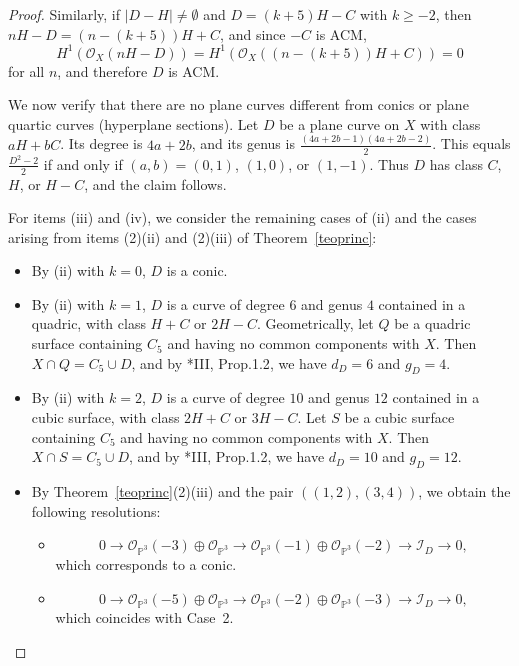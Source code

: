 \documentclass[12pt,reqno]{amsart}
\theoremstyle{plain}
\theoremstyle{definition}
\theoremstyle{remark}
\theoremstyle{definition}
\newcommand{\PP}{\mathds{P}}
\newcommand{\PPP}{\PP^{3}}
\newcommand{\ii}{\mathscr{I}}
\newcommand{\oo}{\mathcal{O}}
\begin{document}
\begin{proof}
Similarly, if $|D-H|\neq\emptyset$ and $D=(k+5)H-C$ with $k\geq-2$, then
$nH-D=(n-(k+5))H+C$, and since $-C$ is ACM,
\[
H^{1}(\oo_{X}(nH-D))=H^{1}(\oo_{X}((n-(k+5))H+C))=0
\]
for all $n$, and therefore $D$ is ACM.

We now verify that there are no plane curves different from conics or plane quartic curves (hyperplane sections). Let $D$ be a plane curve on $X$ with class $aH+bC$. Its degree is $4a+2b$, and its genus is
$\frac{(4a+2b-1)(4a+2b-2)}{2}$.
This equals $\frac{D^{2}-2}{2}$ if and only if $(a,b)=(0,1)$, $(1,0)$, or $(1,-1)$.
Thus $D$ has class $C$, $H$, or $H-C$, and the claim follows.

For items (iii) and (iv), we consider the remaining cases of (ii) and the cases arising from items (2)(ii) and (2)(iii) of Theorem~\ref{teoprinc}:
\begin{itemize}
    \item[\textbf{Case 1:}] By (ii) with $k=0$, $D$ is a conic.

    \item[\textbf{Case 2:}] By (ii) with $k=1$, $D$ is a curve of degree $6$ and genus $4$ contained in a quadric, with class $H+C$ or $2H-C$. Geometrically, let $Q$ be a quadric surface containing $C_{5}$ and having no common components with $X$. Then $X\cap Q=C_{5}\cup D$, and by \cite{mdp2}*{III, Prop.1.2}, we have $d_{D}=6$ and $g_{D}=4$.

    \item[\textbf{Case 3:}] By (ii) with $k=2$, $D$ is a curve of degree $10$ and genus $12$ contained in a cubic surface, with class $2H+C$ or $3H-C$. Let $S$ be a cubic surface containing $C_{5}$ and having no common components with $X$. Then $X\cap S=C_{5}\cup D$, and by \cite{mdp2}*{III, Prop.1.2}, we have $d_{D}=10$ and $g_{D}=12$.

    \item[\textbf{Case 4:}] By Theorem~\ref{teoprinc}(2)(iii) and the pair $((1,2),(3,4))$, we obtain the following resolutions:
    \begin{itemize}
        \item
        \[
        0\to \oo_{\PPP}(-3)\oplus \oo_{\PPP}
        \to \oo_{\PPP}(-1)\oplus \oo_{\PPP}(-2)
        \to \ii_{D}\to 0,
        \]
        which corresponds to a conic.
        \item
        \[
        0\to \oo_{\PPP}(-5)\oplus \oo_{\PPP}
        \to \oo_{\PPP}(-2)\oplus \oo_{\PPP}(-3)
        \to \ii_{D}\to 0,
        \]
        which coincides with Case~2.
    \end{itemize}


\end{itemize}
\end{proof}
\end{document}
